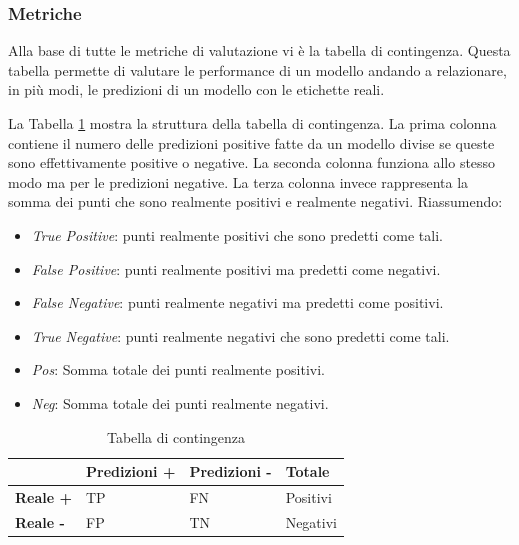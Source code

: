 \subsubsection{Metriche}
Alla base di tutte le metriche di valutazione vi è la tabella di contingenza. Questa tabella permette di valutare le performance di un modello andando a relazionare, in più modi, le predizioni di un modello con le etichette reali.

La Tabella \ref{contigency-table} mostra la struttura della tabella di contingenza.  La prima colonna contiene il numero delle predizioni positive fatte da un modello divise se queste sono effettivamente positive o negative. La seconda colonna funziona allo stesso modo ma per le predizioni negative. La terza colonna invece rappresenta la somma dei punti che sono realmente positivi e realmente negativi.
Riassumendo:
\begin{itemize}
\item \textit{True Positive}: punti realmente positivi che sono predetti come tali.
\item \textit{False Positive}: punti realmente positivi ma predetti come negativi.
\item \textit{False Negative}: punti realmente negativi ma predetti come positivi.
\item \textit{True Negative}: punti realmente negativi che sono predetti come tali.
\item \textit{Pos}: Somma totale dei punti realmente positivi.
\item \textit{Neg}: Somma totale dei punti realmente negativi.
\end{itemize}

\begin{table}[]
\centering
	\caption{\label{contigency-table}Tabella di contingenza}

\begin{tabular}{|l|l|l|l|}
\hline
                 & \textbf{Predizioni +} & \textbf{Predizioni -} & \textbf{Totale} \\ \hline
\textbf{Reale +} & TP                    & FN                    & Positivi        \\ \hline
\textbf{Reale -} & FP                    & TN                    & Negativi        \\ \hline
\end{tabular}
\end{table}

